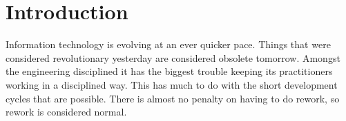 \documentclass[\docroot/main]{subfiles}
\begin{document}
\chapter*{Introduction}

Information technology is evolving at an ever quicker pace. Things that were
considered revolutionary yesterday are considered obsolete tomorrow.
Amongst the engineering disciplined it has the biggest trouble keeping its
practitioners working in a disciplined way. This has much to do with
the short development cycles that are possible. There is almost no
penalty on having to do rework, so rework is considered normal.



\end{document}

